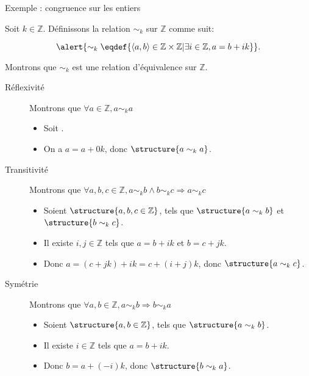 
\begingroup

\begin{frame}{Exemple : congruence sur les entiers}

  Soit $k\in \mathbb{Z}$. Définissons la relation $\sim_k$ sur $\mathbb{Z}$ comme suit:

  $$\alert{\sim_k \eqdef \{\langle a, b\rangle \in \mathbb{Z}\times \mathbb{Z} | \exists i\in \mathbb{Z}, a = b + i k \}}.$$

  
  Montrons que $\sim_k$ est une relation d'équivalence sur $\mathbb{Z}$.
  \begin{description}
  \item[Réflexivité]  Montrons que \alert{$\forall a \in \mathbb{Z}, a \sim_k a$}
    \begin{itemize}
    \item Soit .
    \item On a $a=a + 0k$, donc $\structure{a\sim_k a}$.
    \end{itemize}
  \item[Transitivité] Montrons que \alert{$\forall a, b, c \in \mathbb{Z}, a \sim_k b \land b \sim_k c \Rightarrow a \sim_k c$}
    \begin{itemize}
    \item Soient $\structure{a, b, c \in \mathbb{Z}}$, tels que $\structure{a \sim_k b}$ et $\structure{b \sim_k c}$. 
    \item Il existe $i, j \in \mathbb{Z}$ tels que $a = b + i k$ et $b = c + j k$.
    \item Donc $a = (c + j k) + i k = c + (i+j) k$, donc $\structure{a \sim_k c}$.
    \end{itemize}
  \item[Symétrie] Montrons que \alert{$\forall a, b \in \mathbb{Z}, a \sim_k b \Rightarrow b \sim_k a$}
    \begin{itemize}
    \item Soient $\structure{a, b \in \mathbb{Z}}$, tels que $\structure{a \sim_k b}$. 
    \item Il existe $i \in \mathbb{Z}$ tels que $a = b + i k$.
    \item Donc $b = a + (-i) k$, donc $\structure{b \sim_k a}$.
    \end{itemize}
  \end{description}
\end{frame}

\endgroup
